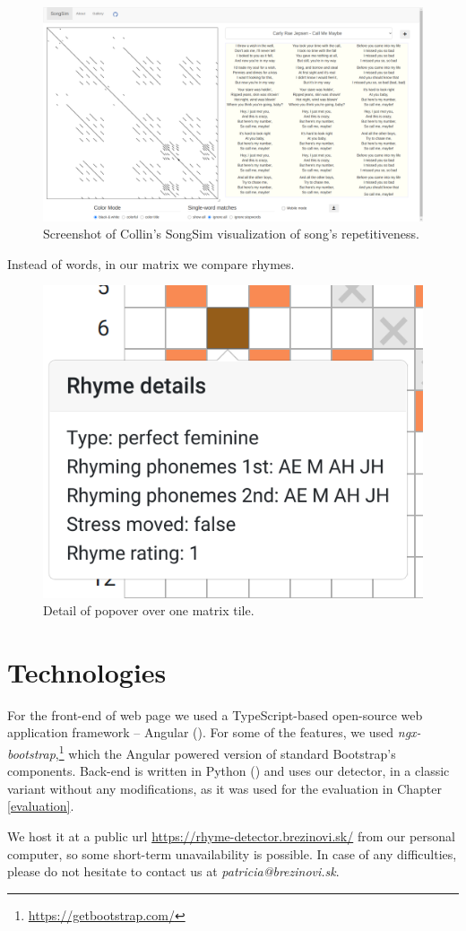 \begin{figure}[h]\centering
	\includegraphics[scale=0.2]{../img/songsim.png}
	\caption{Screenshot of Collin's SongSim visualization of song's repetitiveness.}
	\label{songsim}
\end{figure}

Instead of words, in our matrix we compare rhymes.


\begin{figure}[h]\centering
		\includegraphics[scale=0.45]{../img/popover-detail.png}
	\caption{Detail of popover over one matrix tile.}
	\label{web-popover}
\end{figure}


\section{Technologies}
For the front-end of web page we used a TypeScript-based open-source web application framework --  Angular (\cite{jain2014angularjs}). For some of the features, we used \textit{ngx-bootstrap},\footnote{\url{https://getbootstrap.com/}} which the Angular powered version of standard Bootstrap's components. Back-end is written in Python (\cite{van1995python}) and uses our detector, in a classic variant without any modifications, as it was used for the evaluation in Chapter \ref{evaluation}.

We host it at a public url \url{https://rhyme-detector.brezinovi.sk/} from our personal computer, so some short-term unavailability is possible. In case of any difficulties, please do not hesitate to contact us at \textit{patricia@brezinovi.sk}.